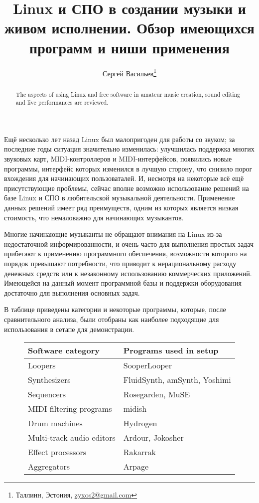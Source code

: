 \documentclass[10pt, a5paper]{article}
\begin{document}
\title{Linux и СПО в создании музыки и живом исполнении. Обзор имеющихся программ и ниши применения}
\author{Сергей Васильев\footnote{Таллинн, Эстония, \url{zyxos2@gmail.com}}}
\date{}
\maketitle
\begin{abstract}
The aspects of using Linux and free software in amateur music creation, sound editing and live performances are reviewed.
\end{abstract}

Ещё несколько лет назад Linux был малопригоден для работы со звуком; за последние годы ситуация значительно изменилась: улучшилась поддержка многих звуковых карт, MIDI-контроллеров и MIDI-интерфейсов, появились новые программы, интерфейс которых изменился в лучшую сторону, что снизило порог вхождения для начинающих пользоваталей. И, несмотря на некоторые всё ещё присутствующие проблемы, сейчас вполне возможно использование решений на базе Linux и СПО в любительской музыкальной деятельности. Применение данных решений имеет ряд преимуществ, одним из которых является низкая стоимость, что немаловажно для начинающих музыкантов. 

Многие начинающие музыканты не обращают внимания на Linux из-за недостаточной информированности, и очень часто для выполнения простых задач прибегают к применению программного обеспечения, возможности которого на порядок превышают потребности, что приводит к нерациональному расходу денежных средств или к незаконному использованию коммерческих приложений. Имеющейся на данный момент программной базы и поддержки оборудования достаточно для выполнения основных задач. 

В таблице приведены категории и некоторые программы, которые, после сравнительного анализа, были отобраны как наиболее подходящие для использования в сетапе для демонстрации.

\begin{figure}[ht]
\centering
\begin{tabular}{|l|l|}
\hline
Software category & Programs used in setup \\
\hline
Loopers & SooperLooper \\
Synthesizers & FluidSynth, amSynth, Yoshimi \\
Sequencers & Rosegarden, MuSE \\
MIDI filtering programs & midish \\
Drum machines & Hydrogen \\
Multi-track audio editors & Ardour, Jokosher \\
Effect processors & Rakarrak \\
Aggregators & Arpage \\
\hline
\end{tabular}
\end{figure}
\end{document}
